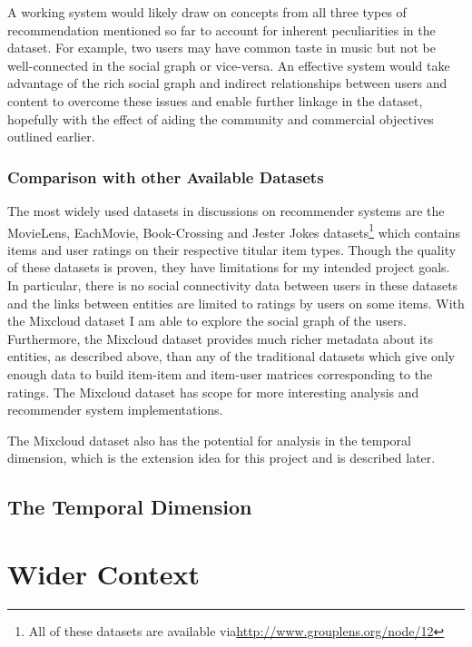 \documentclass[a4paper,12pt,twoside,notitlepage,draft]{report}
\begin{document}
A working system would likely draw on concepts from all three types of 
recommendation mentioned so far to account for inherent peculiarities in the 
dataset. For example, two users may have common taste in music but not be 
well-connected in the social graph or vice-versa. An effective system would 
take advantage of the rich social graph and indirect relationships between 
users and content to overcome these issues and enable further linkage in the 
dataset, hopefully with the effect of aiding the community and commercial 
objectives outlined earlier.

\subsubsection*{Comparison with other Available Datasets}

The most widely used datasets in discussions on recommender systems are the 
MovieLens, EachMovie, Book-Crossing and Jester Jokes datasets\footnote{
All of these datasets are available via\url{http://www.grouplens.org/node/12}} 
which contains items and user ratings on their respective titular item types. 
Though the quality of these datasets is proven, they have limitations for my 
intended project goals. In particular, there is no social connectivity data 
between users in these datasets and the links between entities are limited to 
ratings by users on some items. With the Mixcloud dataset I am able to explore 
the social graph of the users. Furthermore, the Mixcloud dataset provides much 
richer metadata about its entities, as described above, than any of the 
traditional datasets which give only enough data to build item-item and 
item-user matrices corresponding to the ratings. The Mixcloud dataset has scope 
for more interesting analysis and recommender system implementations.

The Mixcloud dataset also has the potential for analysis in the temporal 
dimension, which is the extension idea for this project and is described later.

\subsection*{The Temporal Dimension}

\section{Wider Context}
\end{document}
